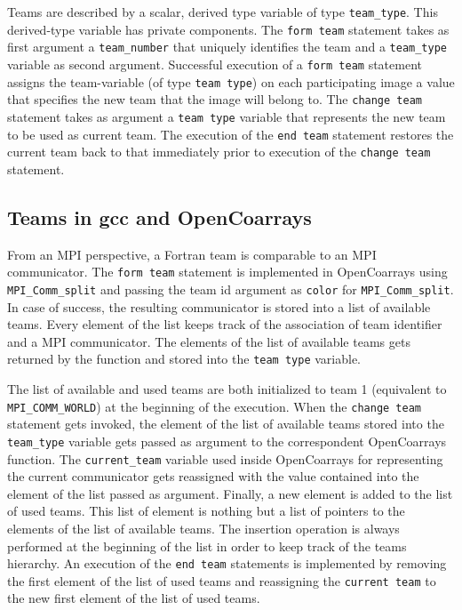 Teams are described by a scalar, derived type variable of type \texttt{team\_type}. This derived-type variable has private components.
The \texttt{form team} statement takes as first argument a \texttt{team\_number} that uniquely identifies the team and a \texttt{team\_type}
variable as second argument.
Successful execution of a \texttt{form team} statement assigns the team-variable (of type \texttt{team type}) on each
participating image a value that specifies the new team that the image will belong to.
The \texttt{change team} statement takes as argument a \texttt{team type} variable that represents the new team to be used as
current team. The execution of the \texttt{end team} statement restores the current team back
to that immediately prior to execution of the \texttt{change team} statement.

\subsection{Teams in \gls{gcc} and OpenCoarrays}\label{subsec:teams-in-gcc}
From an MPI perspective, a Fortran team is comparable to an MPI communicator. The \texttt{form team} statement is implemented in OpenCoarrays
using \texttt{MPI\_Comm\_split} and passing the team id argument as \texttt{color} for \texttt{MPI\_Comm\_split}.
In case of success, the resulting communicator is stored into a list of available teams.
Every element of the list keeps track of the association of team identifier and a MPI communicator.
The elements of the list of available teams gets returned by the function and stored into the \texttt{team type} variable.

The list of available and used teams are both initialized to team 1 (equivalent to \texttt{MPI\_COMM\_WORLD}) at the beginning of the execution.
When the \texttt{change team} statement gets invoked, the element of the list of available teams stored into the \texttt{team\_type} variable
gets passed as argument to the correspondent OpenCoarrays function. The \texttt{current\_team} variable used inside OpenCoarrays for
representing the current communicator gets reassigned with the value contained into the element of the list passed as argument.
Finally, a new element is added to the list of used teams. This list of element is nothing but a list of pointers to the elements of the list
of available teams. The insertion operation is always performed at the beginning of the list in order to keep track of the teams hierarchy.
An execution of the \texttt{end team} statements is implemented by removing the first element of the list of used teams and reassigning the
\texttt{current team} to the new first element of the list of used teams.

